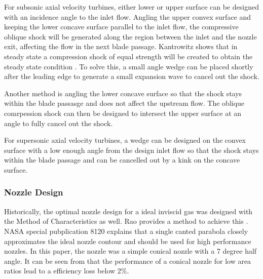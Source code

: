 For subsonic axial velocity turbines, either lower or upper surface can be designed with an incidence angle to the inlet flow. Angling the upper convex surface and keeping the lower concave surface parallel to the inlet flow, the compressive oblique shock will be generated along the region between the inlet and the nozzle exit, affecting the flow in the next blade passage. Kantrowitz shows that in steady state a compression shock of equal strength will be created to obtain the steady state condition \cite{kantrowitz}. To solve this, a small angle wedge can be placed shortly after the leading edge to generate a small expansion wave to cancel out the shock. 

Another method is angling the lower concave surface so that the shock stays within the blade passasge and does not affect the upstream flow. The oblique comrpession shock can then be designed to intersect the upper surface at an angle to fully cancel out the shock.

For supersonic axial velocity turbines, a wedge can be designed on the convex surface with a low enough angle from the design inlet flow so that the shock stays within the blade passage and can be cancelled out by a kink on the concave surface.



\subsubsection{Nozzle Design}

Historically, the optimal nozzle design for a ideal inviscid gas was designed with the Method of Characteristics as well. Rao provides a method to achieve this \cite{raonozzledesign}. NASA special pubplication 8120 explains that a single canted parabola closely approximates the ideal nozzle contour and should be used for high performance nozzles. In this paper, the nozzle was a simple conical nozzle with a 7 degree half angle. It can be seen from  that the performance of a conical nozzle for low area ratios lead to a efficiency loss below 2\%.
